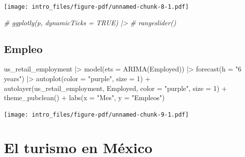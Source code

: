 \documentclass[
  letterpaper,
  DIV=11,
  numbers=noendperiod]{scrartcl}
\newenvironment{Shaded}{}{}
\newcommand{\AttributeTok}[1]{\textcolor[rgb]{0.65,0.15,0.64}{#1}}
\newcommand{\CommentTok}[1]{\textcolor[rgb]{0.63,0.63,0.65}{\textit{#1}}}
\newcommand{\DecValTok}[1]{\textcolor[rgb]{0.60,0.41,0.00}{#1}}
\newcommand{\FunctionTok}[1]{\textcolor[rgb]{0.25,0.47,0.95}{#1}}
\newcommand{\NormalTok}[1]{\textcolor[rgb]{0.22,0.23,0.26}{#1}}
\newcommand{\SpecialCharTok}[1]{\textcolor[rgb]{0.00,0.52,0.74}{#1}}
\newcommand{\StringTok}[1]{\textcolor[rgb]{0.31,0.63,0.31}{#1}}
\begin{document}
\texttt{[image: intro\_files/figure-pdf/unnamed-chunk-8-1.pdf]}

\begin{Shaded}
\begin{Highlighting}[]
\CommentTok{\# ggplotly(p, dynamicTicks = TRUE) |\textgreater{} }
\CommentTok{\#   rangeslider()}
\end{Highlighting}
\end{Shaded}

\subsection{Empleo}\label{empleo-1}

\begin{Shaded}
\begin{Highlighting}[]
\NormalTok{us\_retail\_employment }\SpecialCharTok{|\textgreater{}} 
  \FunctionTok{model}\NormalTok{(}\AttributeTok{ets =} \FunctionTok{ARIMA}\NormalTok{(Employed)) }\SpecialCharTok{|\textgreater{}} 
  \FunctionTok{forecast}\NormalTok{(}\AttributeTok{h =} \StringTok{"6 years"}\NormalTok{) }\SpecialCharTok{|\textgreater{}} 
  \FunctionTok{autoplot}\NormalTok{(}\AttributeTok{color =} \StringTok{"purple"}\NormalTok{, }\AttributeTok{size =} \DecValTok{1}\NormalTok{) }\SpecialCharTok{+}
  \FunctionTok{autolayer}\NormalTok{(us\_retail\_employment, Employed, }\AttributeTok{color =} \StringTok{"purple"}\NormalTok{, }\AttributeTok{size =} \DecValTok{1}\NormalTok{) }\SpecialCharTok{+}
  \FunctionTok{theme\_pubclean}\NormalTok{() }\SpecialCharTok{+}
  \FunctionTok{labs}\NormalTok{(}\AttributeTok{x =} \StringTok{"Mes"}\NormalTok{, }\AttributeTok{y =} \StringTok{"Empleos"}\NormalTok{)}
\end{Highlighting}
\end{Shaded}

\texttt{[image: intro\_files/figure-pdf/unnamed-chunk-9-1.pdf]}

\subsection{}\label{section-6}

\section{El turismo en México}\label{el-turismo-en-muxe9xico}

\subsection{}\label{section-7}
\end{document}
